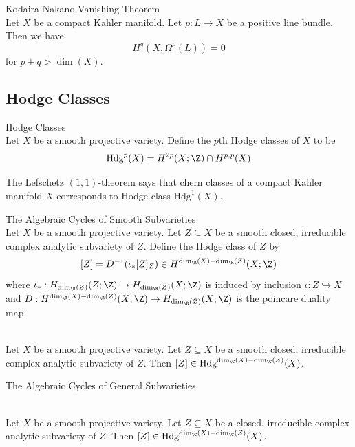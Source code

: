 \documentclass[a4paper]{article}
\begin{document}
\begin{thm}{Kodaira-Nakano Vanishing Theorem}{}\\
Let $X$ be a compact Kahler manifold. Let $p:L\to X$ be a positive line bundle. Then we have $$H^q(X,\Omega^p(L))=0$$ for $p+q>\dim(X)$. 
\end{thm}

\subsection{Hodge Classes}
\begin{defn}{Hodge Classes}{}\\
Let $X$ be a smooth projective variety. Define the $p$th Hodge classes of $X$ to be $$\text{Hdg}^p(X)=H^{2p}(X;\Z)\cap H^{p,p}(X)$$
\end{defn}

The Lefschetz $(1,1)$-theorem says that chern classes of a compact Kahler manifold $X$ corresponds to Hodge class $\text{Hdg}^1(X)$. 

\begin{defn}{The Algebraic Cycles of Smooth Subvarieties}{}\\
Let $X$ be a smooth projective variety. Let $Z\subseteq X$ be a smooth closed, irreducible complex analytic subvariety of $Z$. Define the Hodge class of $Z$ by $$[Z]=D^{-1}(\iota_\ast[Z]_Z)\in H^{\dim_\R(X)-\dim_\R(Z)}(X;\Z)$$ where $\iota_\ast:H_{\dim_\R(Z)}(Z;\Z)\to H_{\dim_\R(Z)}(X;\Z)$ is induced by inclusion $\iota:Z\hookrightarrow X$ and $D:H^{\dim_\R(X)-\dim_\R(Z)}(X;\Z)\to H_{\dim_\R(Z)}(X;\Z)$ is the poincare duality map. 
\end{defn}

\begin{lmm}{}{}\\
Let $X$ be a smooth projective variety. Let $Z\subseteq X$ be a smooth closed, irreducible complex analytic subvariety of $Z$. Then $[Z]\in\text{Hdg}^{\dim_\C(X)-\dim_\C(Z)}(X)$. 
\end{lmm}

\begin{defn}{The Algebraic Cycles of General Subvarieties}{}\\
\end{defn}

\begin{lmm}{}{}\\
Let $X$ be a smooth projective variety. Let $Z\subseteq X$ be a closed, irreducible complex analytic subvariety of $Z$. Then $[Z]\in\text{Hdg}^{\dim_\C(X)-\dim_\C(Z)}(X)$. 
\end{lmm}
\end{document}
